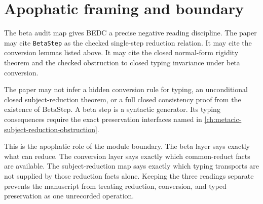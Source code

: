 \section{Apophatic framing and boundary}
\label{sec:metacic-beta-audit-map-boundary}

The beta audit map gives BEDC a precise negative reading discipline. The paper
may cite \texttt{BetaStep} as the checked single-step reduction relation. It may
cite the conversion lemmas listed above. It may cite the closed normal-form
rigidity theorem and the checked obstruction to closed typing invariance under
beta conversion.

The paper may not infer a hidden conversion rule for typing, an unconditional
closed subject-reduction theorem, or a full closed consistency proof from the
existence of $\mathrm{BetaStep}$. A beta step is a syntactic generator. Its
typing consequences require the exact preservation interfaces named in
\autoref{ch:metacic-subject-reduction-obstruction}.

This is the apophatic role of the module boundary. The beta layer says exactly
what can reduce. The conversion layer says exactly which common-reduct facts are
available. The subject-reduction map says exactly which typing transports are
not supplied by those reduction facts alone. Keeping the three readings
separate prevents the manuscript from treating reduction, conversion, and typed
preservation as one unrecorded operation.


